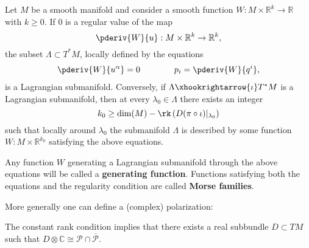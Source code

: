     \begin{theorem}\label{symplectic:maslow_hormander}
        Let $M$ be a smooth manifold and consider a smooth function $W:M\times\mathbb{R}^k\rightarrow\mathbb{R}$ with $k\geq 0$. If 0 is a regular value of the map \[\pderiv{W}{u}:M\times\mathbb{R}^k\rightarrow\mathbb{R}^k,\] the subset $\Lambda\subset T^*M$, locally defined by the equations
        \begin{gather}
            \pderiv{W}{u^\alpha} = 0 \qquad\qquad p_i=\pderiv{W}{q^i},
        \end{gather}
        is a Lagrangian submanifold. Conversely, if $\Lambda\xhookrightarrow{\iota}T^*M$ is a Lagrangian submanifold, then at every $\lambda_0\in\Lambda$ there exists an integer \[k_0\geq\dim(M) - \rk\left(D(\pi\circ\iota)|_{\lambda_0}\right)\] such that locally around $\lambda_0$ the submanifold $\Lambda$ is described by some function $W:M\times\mathbb{R}^{k_0}$ satisfying the above equations.
    \end{theorem}
    Any function $W$ generating a Lagrangian submanifold through the above equations will be called a \textbf{generating function}. Functions satisfying both the equations and the regularity condition are called \textbf{Morse families}.

    More generally one can define a (complex) polarization:
    \begin{remark}
        The constant rank condition implies that there exists a real subbundle $D\subset TM$ such that $D\otimes\mathbb{C}\cong\mathcal{P}\cap\overline{\mathcal{P}}$.
    \end{remark}

